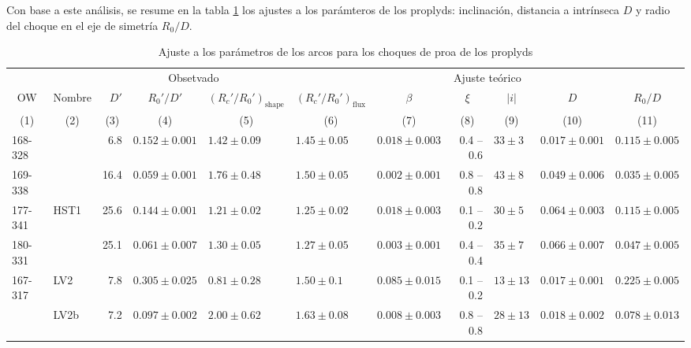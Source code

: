Con base a este análisis, se resume en la tabla \ref{tab:arc-fits} los ajustes a los parámteros de los proplyds: inclinación, distancia a \thC{} intrínseca $D$ y radio del choque en el eje de simetría $R_0/D$.
\begin{table}
  \caption{Ajuste a los parámetros de los arcos para los choques de proa de los proplyds}
  \label{tab:arc-fits} 
\newcommand\C[1]{\multicolumn{1}{c}{#1}}
\begin{tabular}{llrllllrlll}\toprule
             &          & \multicolumn{3}{c}{\dotfill Obsetvado \dotfill}              & \multicolumn{6}{c}{\dotfill Ajuste teórico \dotfill} \\ 
  \C{OW}     & \C{Nombre} & \(D'\) &\C{ \(R_0'/D'\) }&\C{ \((R_c'/R_0')_{\mathrm{shape}}\) }&\C{ \((R_c'/R_0')_{\mathrm{flux}}\) }&\C{ \(\beta\) }&\C{ \(\xi\) }&\C{ \(|i|\) }&\C{ \(D\) }&\C{ \(R_0/D\)}\\
  \C{(1)}& \C{ (2) }&\C{ (3)    }&\C{    (4)      }&\C{              (5)           }&\C{           (6)             }&\C{     (7)   }&\C{   (8)   }&\C{   (9) }&\C{  (10) }&\C{   (11)} \\
\midrule     
 168-328  &            &    6.8  &  $0.152 \pm 0.001$  &  $1.42 \pm 0.09$   &  $1.45 \pm 0.05$     &  $0.018 \pm 0.003$  &  0.4 -- 0.6  &  $33 \pm 3$   &  $0.017 \pm 0.001$  &  $0.115 \pm 0.005$  \\
 169-338  &            &  16.4  &  $0.059 \pm 0.001$  &  $1.76 \pm 0.48$   &  $1.50 \pm 0.05$     &  $0.002 \pm 0.001$  &  0.8 -- 0.8  &  $43 \pm 8$   &  $0.049 \pm 0.006$  &  $0.035 \pm 0.005$  \\
 177-341  & HST1   & 25.6  &  $0.144 \pm 0.001$  &  $1.21 \pm 0.02$   &  $1.25 \pm 0.02$     &  $0.018 \pm 0.003$  &  0.1 -- 0.2  &  $30 \pm 5$   &  $0.064 \pm 0.003$  &  $0.115 \pm 0.005$  \\
 180-331  &             &  25.1  &  $0.061 \pm 0.007$  &  $1.30 \pm 0.05$   &  $1.27 \pm 0.05$     &  $0.003 \pm 0.001$  &  0.4 -- 0.4  &  $35 \pm 7$   &  $0.066 \pm 0.007$  &  $0.047 \pm 0.005$  \\
 167-317  &  LV2     &    7.8  &  $0.305 \pm 0.025$  &  $0.81 \pm 0.28$   &  $1.50 \pm 0.1$      &  $0.085 \pm 0.015$  &  0.1 -- 0.2  &  $13 \pm 13$  &  $0.017 \pm 0.001$  &  $0.225 \pm 0.005$  \\
               & LV2b    &   7.2  &  $0.097 \pm 0.002$  &  $2.00 \pm 0.62$   &  $1.63 \pm 0.08$     &  $0.008 \pm 0.003$  &  0.8 -- 0.8  &  $28 \pm 13$  &  $0.018 \pm 0.002$  &  $0.078 \pm 0.013$  \\

\end{tabular}
\end{table}
